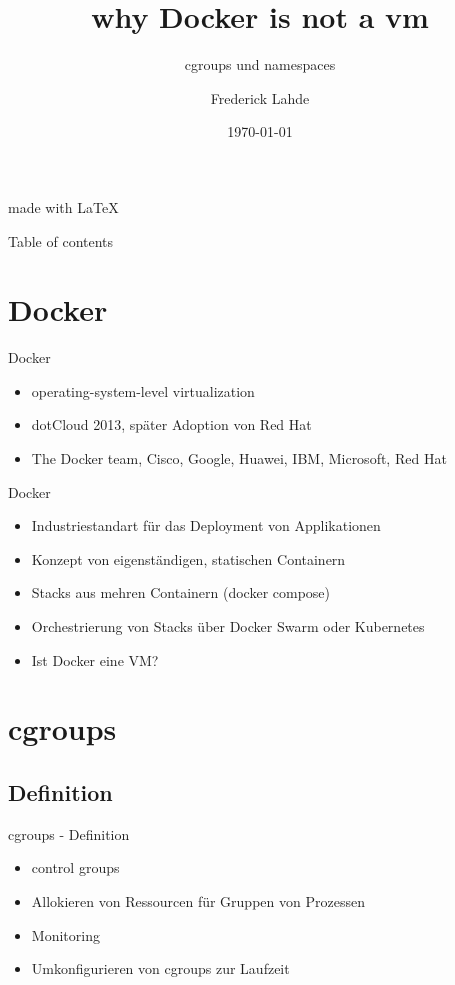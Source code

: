 \documentclass[14pt]{beamer}
\author{
    Frederick Lahde
  }
\title[]{why Docker is not a vm}
\subtitle{cgroups und namespaces}
\institute{Hochschule Emden/Leer}
\date{\today}
\begin{document}
    \begin{frame}[plain]
      \maketitle
      \centering
      \begin{figure}[H]
      \end{figure}
      \tiny{made with \LaTeX}
    \end{frame}
  
    \begin{frame}{Table of contents}
      \setcounter{tocdepth}{1}
      \tableofcontents
    \end{frame}
    
    \section{Docker}
    \begin{frame}{Docker}
    \begin{itemize}
    \item operating-system-level virtualization
    \item dotCloud 2013, später Adoption von Red Hat
    \item The Docker team, Cisco, Google, Huawei, IBM, Microsoft, Red Hat
    \end{itemize}
    \end{frame}
    
     \begin{frame}{Docker}
    \begin{itemize}
    \item Industriestandart für das Deployment von Applikationen
    \item Konzept von eigenständigen, statischen Containern
    \item Stacks aus mehren Containern (docker compose)
    \item Orchestrierung von Stacks über Docker Swarm oder Kubernetes
    \item Ist Docker eine VM?
    \end{itemize}
    \end{frame}
    
    \section{cgroups}
    \subsection{Definition}
    \begin{frame}{cgroups - Definition}
    	\begin{itemize}
    	\item control groups
        \item Allokieren von Ressourcen für Gruppen von Prozessen
        \item Monitoring
        \item Umkonfigurieren von cgroups zur Laufzeit
    	\end{itemize}
    \end{frame}
\end{document}
